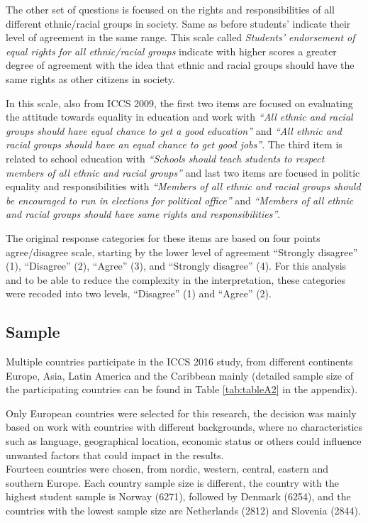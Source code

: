 \documentclass[12pt,a4paper,oneside]{reedthesis}
\begin{document}
The other set of questions is focused on the rights and responsibilities of all different ethnic/racial groups in society. Same as before students' indicate their level of agreement in the same range. This scale called \emph{Students' endorsement of equal rights for all ethnic/racial groups} indicate with higher scores a greater degree of agreement with the idea that ethnic and racial groups should have the same rights as other citizens in society.

In this scale, also from ICCS 2009, the first two items are focused on evaluating the attitude towards equality in education and work with \emph{``All ethnic and racial groups should have equal chance to get a good education''} and \emph{``All ethnic and racial groups should have an equal chance to get good jobs''}. The third item is related to school education with \emph{``Schools should teach students to respect members of all ethnic and racial groups''} and last two items are focused in politic equality and responsibilities with \emph{``Members of all ethnic and racial groups should be encouraged to run in elections for political office''} and \emph{``Members of all ethnic and racial groups should have same rights and responsibilities''}.

The original response categories for these items are based on four points agree/disagree scale, starting by the lower level of agreement ``Strongly disagree'' (1), ``Disagree'' (2), ``Agree'' (3), and ``Strongly disagree'' (4). For this analysis and to be able to reduce the complexity in the interpretation, these categories were recoded into two levels, ``Disagree'' (1) and ``Agree'' (2).

\hypertarget{sample}{%
\subsection{Sample}\label{sample}}

Multiple countries participate in the ICCS 2016 study, from different continents Europe, Asia, Latin America and the Caribbean mainly (detailed sample size of the participating countries can be found in Table \ref{tab:tableA2} in the appendix).

Only European countries were selected for this research, the decision was mainly based on work with countries with different backgrounds, where no characteristics such as language, geographical location, economic status or others could influence unwanted factors that could impact in the results.\\
Fourteen countries were chosen, from nordic, western, central, eastern and southern Europe. Each country sample size is different, the country with the highest student sample is Norway (6271), followed by Denmark (6254), and the countries with the lowest sample size are Netherlands (2812) and Slovenia (2844).
\end{document}

